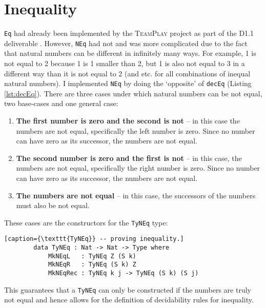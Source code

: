 \section{Inequality}
    \texttt{Eq} had already been implemented by the \textsc{TeamPlay} project as part of the D1.1 deliverable \cite{teamplay:d1.1}. However, \texttt{NEq} had not and was more complicated due to the fact that natural numbers can be different in infinitely many ways. For example, 1 is not equal to 2 because 1 is 1 smaller than 2, but 1 is also not equal to 3 in a different way than it is not equal to 2 (and etc. for all combinations of inequal natural numbers). I implemented \texttt{NEq} by doing the `opposite' of \texttt{decEq} (Listing \ref{lst:decEq}). There are three cases under which natural numbers can be not equal, two base-cases and one general case:
    \begin{enumerate}
        \item \textbf{The first number is zero and the second is not} -- in this case the numbers are not equal, specifically the left number is zero. Since no number can have zero as its successor, the numbers are not equal.
        \item \textbf{The second number is zero and the first is not} -- in this case, the numbers are not equal, specifically the right number is zero. Since no number can have zero as its successor, the numbers are not equal.
        \item \textbf{The numbers are not equal} -- in this case, the successors of the numbers must also be not equal.
    \end{enumerate}
    These cases are the constructors for the \texttt{TyNEq} type:
    \begin{lstlisting}[caption={\texttt{TyNEq}} -- proving inequality.]
        data TyNEq : Nat -> Nat -> Type where
            MkNEqL   : TyNEq Z (S k)
            MkNEqR   : TyNEq (S k) Z
            MkNEqRec : TyNEq k j -> TyNEq (S k) (S j)
    \end{lstlisting}
    This guarantees that a \texttt{TyNEq} can only be constructed if the numbers are truly not equal and hence allows for the definition of decidability rules for inequality.

